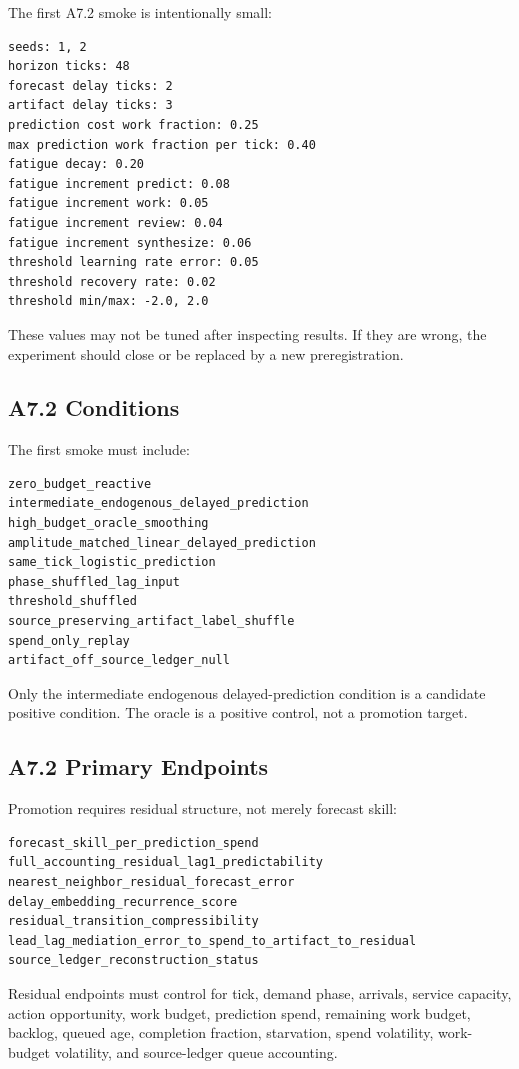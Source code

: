 \documentclass[11pt]{article}
\begin{document}
The first A7.2 smoke is intentionally small:

\begin{verbatim}
seeds: 1, 2
horizon ticks: 48
forecast delay ticks: 2
artifact delay ticks: 3
prediction cost work fraction: 0.25
max prediction work fraction per tick: 0.40
fatigue decay: 0.20
fatigue increment predict: 0.08
fatigue increment work: 0.05
fatigue increment review: 0.04
fatigue increment synthesize: 0.06
threshold learning rate error: 0.05
threshold recovery rate: 0.02
threshold min/max: -2.0, 2.0
\end{verbatim}

These values may not be tuned after inspecting results. If they are wrong, the
experiment should close or be replaced by a new preregistration.

\subsection{A7.2 Conditions}

The first smoke must include:

\begin{verbatim}
zero_budget_reactive
intermediate_endogenous_delayed_prediction
high_budget_oracle_smoothing
amplitude_matched_linear_delayed_prediction
same_tick_logistic_prediction
phase_shuffled_lag_input
threshold_shuffled
source_preserving_artifact_label_shuffle
spend_only_replay
artifact_off_source_ledger_null
\end{verbatim}

Only the intermediate endogenous delayed-prediction condition is a candidate
positive condition. The oracle is a positive control, not a promotion target.

\subsection{A7.2 Primary Endpoints}

Promotion requires residual structure, not merely forecast skill:

\begin{verbatim}
forecast_skill_per_prediction_spend
full_accounting_residual_lag1_predictability
nearest_neighbor_residual_forecast_error
delay_embedding_recurrence_score
residual_transition_compressibility
lead_lag_mediation_error_to_spend_to_artifact_to_residual
source_ledger_reconstruction_status
\end{verbatim}

Residual endpoints must control for tick, demand phase, arrivals, service
capacity, action opportunity, work budget, prediction spend, remaining work
budget, backlog, queued age, completion fraction, starvation, spend
volatility, work-budget volatility, and source-ledger queue accounting.
\end{document}
